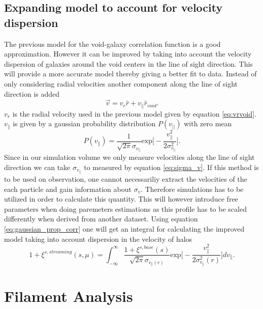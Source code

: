 \subsection{Expanding model to account for velocity dispersion}
The previous model for the void-galaxy correlation function is a good
approximation. However it can be improved by taking into account the velocity
dispersion of galaxies around the void centers in the line of sight direction.
This will provide a more accurate model thereby giving a better fit to data.
Instead of only considering radial velocities another component along the line
of sight direction is added
\begin{equation}
    \vec{v}=v_r\hat{r}+v_\parallel \hat{r}_{void}.
\end{equation}
$v_r$ is the radial velocity used in the previous model given by equation
\ref{eq:vrvoid}. $v_\parallel$ is given by a gaussian probability distribution
$P(v_{\vert\vert})$ with zero mean
\begin{equation}\label{eq:gaussian_prop_corr}
    P(v_\parallel)=\frac{1}{\sqrt{2\pi}\sigma_{v_{\parallel}}}\mathrm{exp}\Big[-\frac{v_\parallel^2}{2\sigma_{v_\parallel}^2}\Big].
\end{equation}
Since in our simulation volume we only measure velocities along the line of
sight direction we can take $\sigma_{v_{\parallel}}$ to measured by equation
\ref{eq:sigma_v}. If this method is to be used on observation, one cannot necessariliy extract the velocities of the each particle and gain information about $\sigma_v$. Therefore simulations has to be utilized in order to calculate this quantity. This will however introduce free parameters when doing paremeters estimations as this profile has to be scaled differently when derived from another dataset. Using equation \ref{eq:gaussian_prop_corr} one will get an integral for calculating the improved
model taking into account dispersion in the velocity of halos \cite{BeyondBAO}
\begin{equation}\label{eq:corr_stream}
    1+\xi^{s,streaming}(s,\mu)=\int_{-\infty}^\infty\frac{1+\xi^{s,base}(s)}{\sqrt{2\pi}\sigma_{v_{\parallel}(r)}}\mathrm{exp}\Big[-\frac{v_\parallel^2}{2\sigma_{v_\parallel}^2(r)}\Big]dv_\parallel.
\end{equation}
\section{Filament Analysis}
